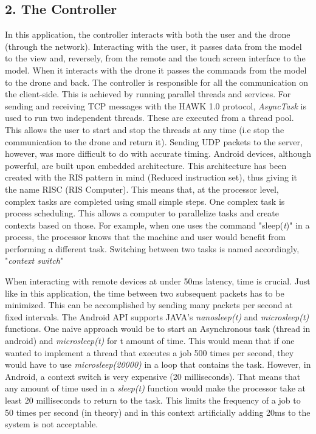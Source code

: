 \documentclass{IEEEtran}
\begin{document}
\subsection*{{2. The Controller}}
\noindent In this application, the controller interacts with both the user and the drone (through the network). Interacting with the user, it passes data from the model to the view and, reversely, from the remote and the touch screen interface to the model. When it interacts with the drone it passes the commands from the model to the drone and back.
\newline
\newline
The controller is responsible for all the communication on the client-side. This is achieved by running parallel threads and services. For sending and receiving TCP messages with the HAWK 1.0 protocol, \textit{AsyncTask} is used to run two independent threads. These are executed from a thread pool. This allows the user to start and stop the threads at any time (i.e stop the communication to the drone and return it). 
\newline 
\newline
Sending UDP packets to the server, however, was more difficult to do with accurate timing. Android devices, although powerful, are built upon embedded architecture. This architecture has been created with the RIS pattern in mind (Reduced instruction set), thus giving it the name RISC (RIS Computer). This means that, at the processor level, complex tasks are completed using small simple steps. One complex task is process scheduling. This allows a computer to parallelize tasks and create contexts based on those. For example, when one uses the command "sleep(\textit{t})" in a process, the processor knows that the machine and user would benefit from performing a different task.  Switching between two tasks is named accordingly, "\textit{context switch}"
\subtitle{Context switches are expensive}
When interacting with remote devices at under 50ms latency, time is crucial. Just like in this application, the time between two subsequent packets has to be minimized. This can be accomplished by sending many packets per second at fixed intervals. The Android API supports JAVA's \textit{nanosleep(t)} and \textit{microsleep(t)} functions. One naive approach would be to start an Asynchronous task (thread in android) and \textit{microsleep(t)} for t amount of time. This would mean that if one wanted to implement a thread that executes a job 500 times per second, they would have to use \textit{microsleep(20000)} in a loop that contains the task. However, in Android, a context switch is very expensive (20 milliseconds). That means that any amount of time used in a \textit{sleep(t)} function would make the processor take at least 20 milliseconds to return to the task. This limits the frequency of a job to 50 times per second (in theory) and in this context artificially adding 20ms to the system is not acceptable.
\end{document}
